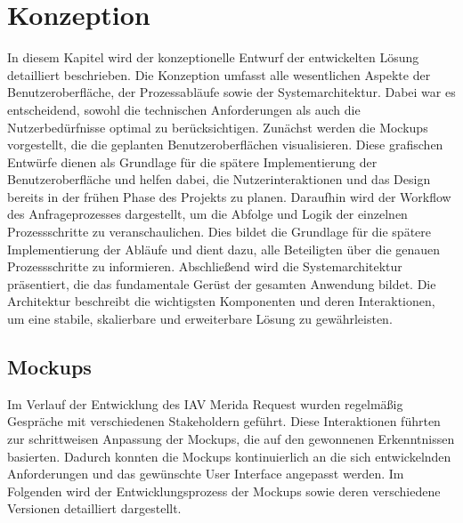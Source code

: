 \chapter{Konzeption}
In diesem Kapitel wird der konzeptionelle Entwurf der entwickelten Lösung detailliert beschrieben. Die Konzeption umfasst alle wesentlichen Aspekte der Benutzeroberfläche, der Prozessabläufe sowie der Systemarchitektur. Dabei war es entscheidend, sowohl die technischen Anforderungen als auch die Nutzerbedürfnisse optimal zu berücksichtigen.
\newline
Zunächst werden die Mockups vorgestellt, die die geplanten Benutzeroberflächen visualisieren. Diese grafischen Entwürfe dienen als Grundlage für die spätere Implementierung der Benutzeroberfläche und helfen dabei, die Nutzerinteraktionen und das Design bereits in der frühen Phase des Projekts zu planen.
\newline
Daraufhin wird der Workflow des Anfrageprozesses dargestellt, um die Abfolge und Logik der einzelnen Prozessschritte zu veranschaulichen. Dies bildet die Grundlage für die spätere Implementierung der Abläufe und dient dazu, alle Beteiligten über die genauen Prozessschritte zu informieren.
\newline
Abschließend wird die Systemarchitektur präsentiert, die das fundamentale Gerüst der gesamten Anwendung bildet. Die Architektur beschreibt die wichtigsten Komponenten und deren Interaktionen, um eine stabile, skalierbare und erweiterbare Lösung zu gewährleisten.
\newpage
\section{Mockups}
Im Verlauf der Entwicklung des IAV Merida Request wurden regelmäßig Gespräche mit verschiedenen Stakeholdern geführt. Diese Interaktionen führten zur schrittweisen Anpassung der Mockups, die auf den gewonnenen Erkenntnissen basierten. Dadurch konnten die Mockups kontinuierlich an die sich entwickelnden Anforderungen und das gewünschte User Interface angepasst werden. Im Folgenden wird der Entwicklungsprozess der Mockups sowie deren verschiedene Versionen detailliert dargestellt.
